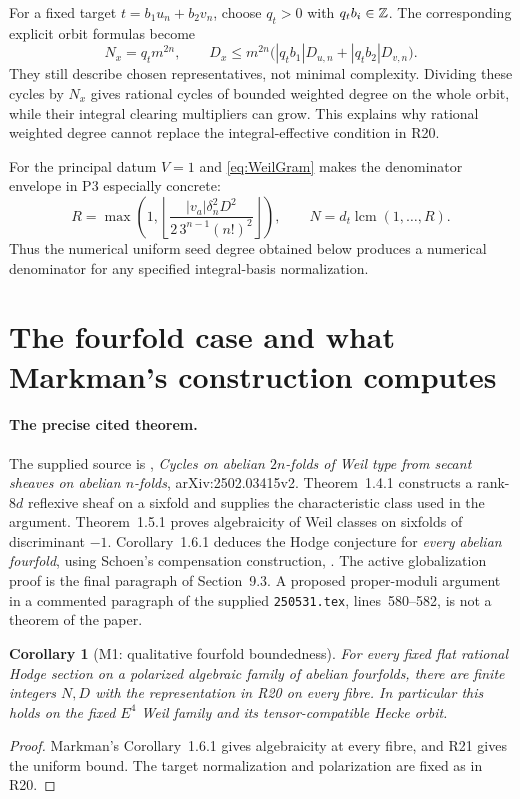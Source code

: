 \documentclass[11pt,a4paper]{article}
\newtheorem{corollary}[theorem]{Corollary}
\theoremstyle{definition}\newtheorem{definition}[theorem]{Definition}
\theoremstyle{remark}\newtheorem{remark}[theorem]{Remark}
\begin{document}
For a fixed target $t=b_1u_n+b_2v_n$, choose $q_t>0$ with $q_tb_i\in\mathbb Z$. The corresponding explicit orbit formulas become
\[
 N_x=q_tm^{2n},\qquad
 D_x\le m^{2n}\bigl(|q_tb_1|D_{u,n}+|q_tb_2|D_{v,n}\bigr).
\]
They still describe chosen representatives, not minimal complexity. Dividing these cycles by $N_x$ gives rational cycles of bounded weighted degree on the whole orbit, while their integral clearing multipliers can grow. This explains why rational weighted degree cannot replace the integral-effective condition in R20.

For the principal datum $V=1$ and \eqref{eq:WeilGram} makes the denominator envelope in P3 especially concrete:
\[
 R=\max\left(1,\left\lfloor
 \frac{|v_a|\delta_n^2D^2}{2\,3^{n-1}(n!)^2}
 \right\rfloor\right),\qquad
 N=d_t\operatorname{lcm}(1,\ldots,R).
\]
Thus the numerical uniform seed degree obtained below produces a numerical denominator for any specified integral-basis normalization.




\section{The fourfold case and what Markman's construction computes}\label{sec:markman}
\paragraph{The precise cited theorem.}
The supplied source is \citet{Markman25}, \emph{Cycles on abelian $2n$-folds of Weil type from secant sheaves on abelian $n$-folds}, arXiv:2502.03415v2. Theorem~1.4.1 constructs a rank-$8d$ reflexive sheaf on a sixfold and supplies the characteristic class used in the argument. Theorem~1.5.1 proves algebraicity of Weil classes on sixfolds of discriminant $-1$. Corollary~1.6.1 deduces the Hodge conjecture for \emph{every abelian fourfold}, using Schoen's compensation construction, \citet[Proposition~10]{Schoen98}. The active globalization proof is the final paragraph of Section~9.3. A proposed proper-moduli argument in a commented paragraph of the supplied \texttt{250531.tex}, lines~580--582, is not a theorem of the paper.

\begin{corollary}[M1: qualitative fourfold boundedness]\label{M1}
For every fixed flat rational Hodge section on a polarized algebraic family of abelian fourfolds, there are finite integers $N,D$ with the representation in R20 on every fibre. In particular this holds on the fixed $E^4$ Weil family and its tensor-compatible Hecke orbit.
\end{corollary}
\begin{proof}
Markman's Corollary~1.6.1 gives algebraicity at every fibre, and R21 gives the uniform bound. The target normalization and polarization are fixed as in R20.
\end{proof}
\end{document}
